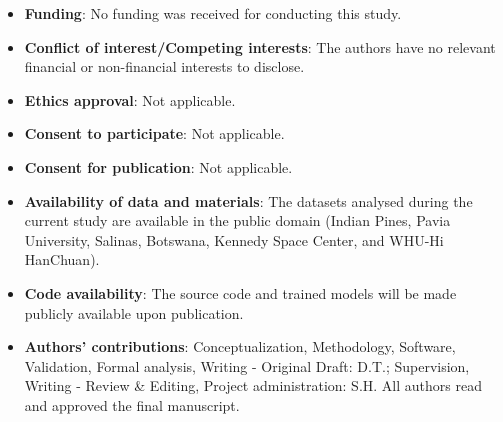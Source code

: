 \documentclass[pdflatex,sn-mathphys-num]{sn-jnl}
\theoremstyle{thmstyleone}
\theoremstyle{thmstyletwo}
\theoremstyle{thmstylethree}
\begin{document}
\begin{itemize}
\item \textbf{Funding}: No funding was received for conducting this study.
\item \textbf{Conflict of interest/Competing interests}: The authors have no relevant financial or non-financial interests to disclose.
\item \textbf{Ethics approval}: Not applicable.
\item \textbf{Consent to participate}: Not applicable.
\item \textbf{Consent for publication}: Not applicable.
\item \textbf{Availability of data and materials}: The datasets analysed during the current study are available in the public domain (Indian Pines, Pavia University, Salinas, Botswana, Kennedy Space Center, and WHU-Hi HanChuan).
\item \textbf{Code availability}: The source code and trained models will be made publicly available upon publication.
\item \textbf{Authors' contributions}: Conceptualization, Methodology, Software, Validation, Formal analysis, Writing - Original Draft: D.T.; Supervision, Writing - Review \& Editing, Project administration: S.H. All authors read and approved the final manuscript.
\end{itemize}

\nocite{*}

\end{document}
